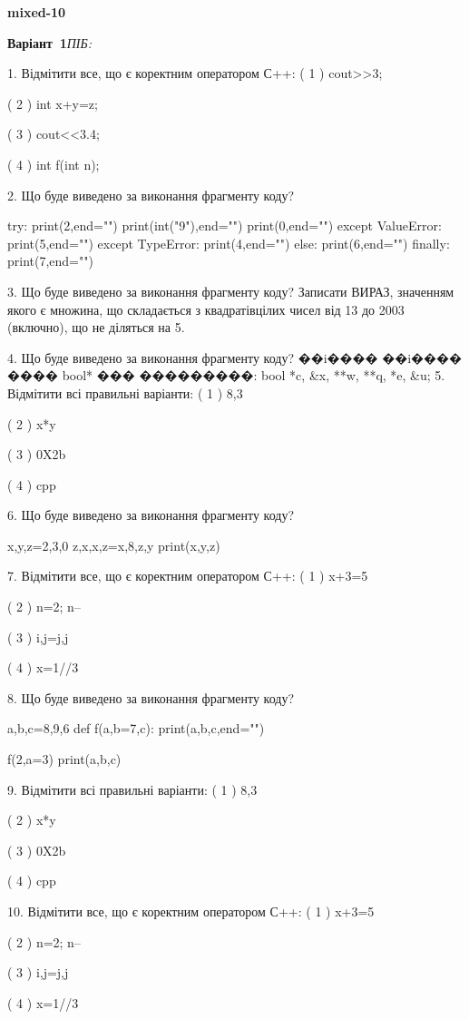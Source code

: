 \documentclass[11pt]{article}
\begin{document}
{\large\textbf{mixed-10}}

\textbf{Варіант \No\,1}\hfill \textit{ПІБ:}\,\underline{\hspace{60mm}}
\vspace{4mm}

1. Відмітити все, що є коректним оператором С++:
( 1 ) cout>>3;

( 2 ) int x+y=z;

( 3 ) cout<<3.4;

( 4 ) int f(int n);

2. Що буде виведено за виконання фрагменту коду?

try:
    print(2,end="")
    print(int("9"),end="")
    print(0,end="")
except ValueError: print(5,end="")
except TypeError: print(4,end="")
else: print(6,end="")
finally: print(7,end="")


3. Що буде виведено за виконання фрагменту коду?
Записати ВИРАЗ, значенням якого є множина, що складається з квадратівцілих чисел від 13 до 2003 (включно), що не діляться на 5.

4. Що буде виведено за виконання фрагменту коду?
��i���� ��i���� ���� bool* ��� ���������: bool *c, &x, **w, **q, *e, &u;
5. Відмітити всі правильні варіанти:
( 1 ) 8,3

( 2 ) x*y

( 3 ) 0X2b

( 4 ) cpp

6. Що буде виведено за виконання фрагменту коду?

x,y,z=2,3,0
z,x,x,z=x,8,z,y
print(x,y,z)

7. Відмітити все, що є коректним оператором С++:
( 1 ) x+3=5

( 2 ) n=2; n--

( 3 ) i,j=j,j

( 4 ) x=1//3

8. Що буде виведено за виконання фрагменту коду?

a,b,c=8,9,6
def f(a,b=7,c):
    print(a,b,c,end="")

f(2,a=3)
print(a,b,c)


9. Відмітити всі правильні варіанти:
( 1 ) 8,3

( 2 ) x*y

( 3 ) 0X2b

( 4 ) cpp

10. Відмітити все, що є коректним оператором С++:
( 1 ) x+3=5

( 2 ) n=2; n--

( 3 ) i,j=j,j

( 4 ) x=1//3











\newpage
\end{document}
